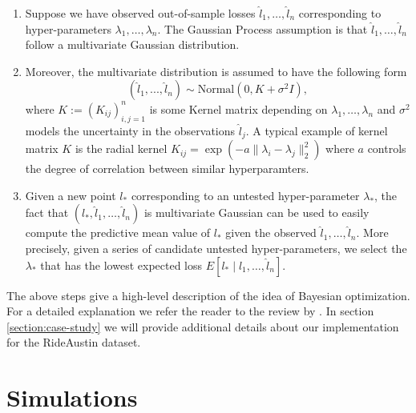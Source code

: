 \documentclass[a4paper, 11pt]{article}
\begin{document}
\begin{enumerate}[itemsep=0pt, partopsep=0pt]
    \item Suppose we have observed out-of-sample losses $\hat{l}_1,\hdots, \hat{l}_n$ corresponding to hyper-parameters $\lambda_1,\hdots, \lambda_n$. The Gaussian Process assumption is that $\hat{l}_1,\hdots, \hat{l}_n$ follow a multivariate Gaussian distribution.
    \item Moreover, the multivariate distribution is assumed to have the following form
    $$
    (\hat{l}_1,...,\hat{l}_n)  \sim \mathrm{Normal}(0, K + \sigma^2 I), 
    $$
    where $K:=(K_{ij})_{i,j=1}^n$ is some Kernel matrix depending on $\lambda_1,\hdots,\lambda_n$ and $\sigma^2$ models the uncertainty in the observations $\hat{l}_j$. A typical example of kernel matrix $K$ is the radial kernel $K_{ij}=\exp(-a \lVert \lambda_i - \lambda_j\rVert^2_2)$ where $a$ controls the degree of correlation between similar hyperparamters.
    \item Given a new point $l_*$ corresponding to an untested hyper-parameter $\lambda_*$, the fact that $(l_*, \hat{l}_1,\hdots, \hat{l}_n)$ is multivariate Gaussian can be used to easily compute the predictive mean value of $l_*$ given the observed $\hat{l}_1,\hdots, \hat{l}_n$. More precisely, given a series of candidate untested hyper-parameters, we select the $\lambda_*$ that has the lowest expected loss $E[l_* \mid \hat{l}_1,\hdots, \hat{l}_n]$.
\end{enumerate}
The above steps give a high-level description of the idea of Bayesian optimization. For a detailed explanation we refer the reader to the review by \citet{shahriari-etal-2016}. In section \ref{section:case-study} we will provide additional details about our implementation for the RideAustin dataset.





\section{Simulations}\label{section:simulation}
\end{document}
